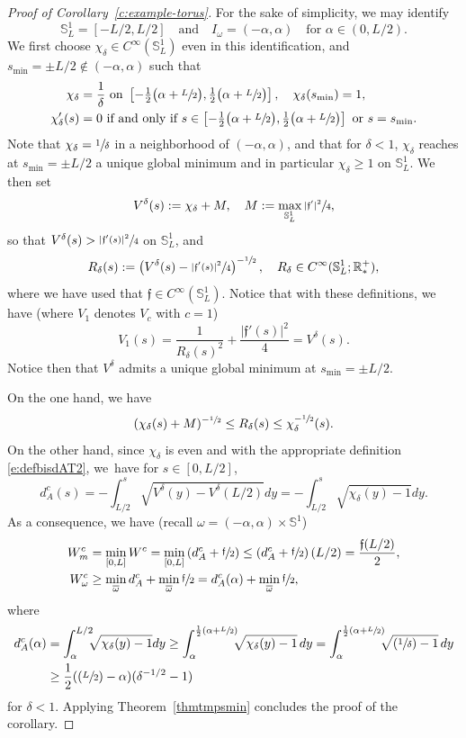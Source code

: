 \documentclass[10pt]{amsart}
\newcommand{\Psfrac}[2]{(\sfrac{#1}{#2})}
\theoremstyle{definition}
\newcommand{\mb}[1]{\ensuremath{\mathbb{#1}}}
\newcommand{\R}{{\mb{R}}}
\newcommand{\bS}{\ensuremath{\mathbb S}}
\newcommand{\f}{\ensuremath{\mathfrak{f}}}
\newcommand\bnp{\begin{proof}}
\newcommand\enp{\end{proof}}
\newcommand{\ce}{c}
\begin{document}
\bnp[Proof of Corollary~\ref{c:example-torus}]
For the sake of simplicity, we may identify
\[
\bS^1_L = [-L/2,L/2]\quad\text{and}\quad I_\omega= (-\alpha,\alpha)\quad\text{for }\alpha \in (0,L/2).
\]
We first choose $\chi_\delta \in C^\infty(\bS^1_L)$ even in this identification, and $s_{\min} = \pm L/2 \notin (-\alpha,\alpha)$ such that
\begin{align*}
\chi_\delta &=\frac{1}{\delta} \text{ on } \left[-\tfrac12\big(\alpha+\sfrac{L}{2}\big),\tfrac12\big(\alpha+\sfrac{L}{2}\big) \right], \quad \chi_\delta(s_{\min}) = 1, \\
\chi_\delta'(s) &= 0 \text{ if and only if } s\in \left[-\tfrac12\big(\alpha+\sfrac{L}{2}\big),\tfrac12\big(\alpha+\sfrac{L}{2}\big) \right] \text{ or } s= s_{\min}.
\end{align*}
Note that $\chi_\delta=\sfrac{1}{\delta}$ in a neighborhood of $(-\alpha, \alpha)$, and that for $\delta<1$, $\chi_\delta$ reaches at $s_{\min}=\pm L/2$ a unique global minimum and in particular $\chi_\delta \geq 1$ on $\bS^1_L$.
We then set
\[
V^\delta(s) := \chi_\delta +M, \quad M:= \max_{\bS^1_L}\sfrac{|\f'|^2}{4},
\]
so that $V^\delta(s)>\sfrac{|\f'(s)|^2}{4}$ on $\bS^1_L$, and
\[
R_\delta(s) := \left(V^\delta(s) - \sfrac{|\f'(s)|^2}{4} \right)^{-\sfrac12}, \quad R_\delta \in C^\infty(\bS^1_L; \R^+_*),
\]
where we have used that $\f\in C^{\infty}(\bS^1_L)$.
Notice that with these definitions, we have (where $V_1$ denotes $V_\ce$ with $\ce=1$)
\[
V_1 (s) = \frac{1}{R_\delta(s)^2} + \frac{|\f'(s)|^2}{4} = V^\delta(s).
\]
Notice then that $V^\delta$ admits a unique global minimum at $s_{\min} =\pm L/2$.

On the one hand, we have
\[
(\chi_\delta(s) +M)^{-\sfrac12}\leq R_\delta(s) \leq \chi_\delta^{-\sfrac12}(s).
\]
On the other hand, since $\chi_\delta$ is even and with the appropriate definition \eqref{e:defbisdAT2}, we~have for $s\in [0, L/2]$,
\[
d_A^{\ce}(s) = - \int_{L/2}^s \sqrt{ V^\delta(y)- V^\delta(L/2)} dy
= - \int_{L/2}^s \sqrt{\chi_\delta(y) - 1} dy.
\]
As a consequence, we have (recall $\omega = (-\alpha,\alpha) \times \bS^1$)
\begin{align*}
W^{\ce}_m & = \min_{[0,L]}W^{\ce} = \min_{[0,L]} \left( d_A^{\ce} +\sfrac{\f}{2} \right) \leq \left( d_A^{\ce} +\sfrac{\f}{2} \right) (L/2) = \frac{\f(L/2)}{2}, \\
W^{\ce}_{\omega} & \geq \min_{\overline{\omega}} d_{A}^{\ce} +\min_{\overline{\omega}} \sfrac{\f}{2} = d_{A}^{\ce}(\alpha) +\min_{\overline{\omega}} \sfrac{\f}{2},
\end{align*}
where
\begin{align*}
d_A^{\ce} (\alpha) &=\int_\alpha^{L/2}\hspace*{-2mm} \sqrt{\chi_\delta(y) - 1} dy \geq \int_\alpha^{\frac12(\alpha+\sfrac{L}{2})}\hspace*{-2mm} \sqrt{\chi_\delta(y) - 1}\, dy
=\int_\alpha^{\frac12(\alpha+\sfrac{L}{2})}\hspace*{-2mm} \sqrt{\Psfrac{1}{\delta} - 1}\, dy \\
& \geq \frac12(\Psfrac{L}{2}-\alpha) (\delta^{-1/2}-1)
\end{align*}
for $\delta<1$. Applying Theorem~\ref{thmtmpsmin} concludes the proof of the corollary.
\enp
\end{document}
